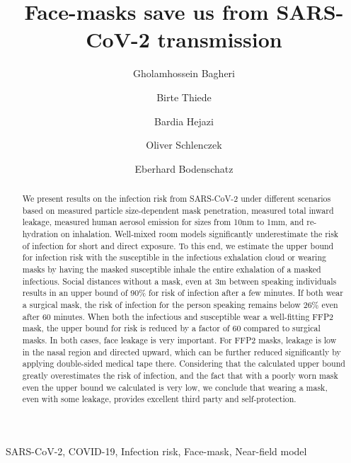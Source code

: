 \documentclass[preprint]{elsarticle}
\begin{document}
\begin{frontmatter}
\title{Face-masks save us from SARS-CoV-2 transmission}

\author[1]{Gholamhossein Bagheri}
\author[1]{Birte Thiede}
\author[1]{Bardia Hejazi}

\author[1]{Oliver Schlenczek}

\author[1,2,3]{Eberhard Bodenschatz}



\address[1]{Max Planck Institute for Dynamics and Self-Organization (MPIDS), Göttingen 37077 , Germany}
\address[2]{Institute for Dynamics of Complex Systems, University of Göttingen, Göttingen 37077 , Germany}
\address[3]{Laboratory of Atomic and Solid State Physics and Sibley School of Mechanical and Aerospace Engineering, Cornell University, Ithaca, NY 14853, USA}





\begin{abstract}
We present results on the infection risk from SARS-CoV-2 under different scenarios based on measured particle size-dependent mask penetration, measured total inward leakage, measured human aerosol emission for sizes from 10nm to 1mm, and re-hydration on inhalation. Well-mixed room models significantly underestimate the risk of infection for short and direct exposure. To this end, we estimate the upper bound for infection risk with the susceptible in the infectious exhalation cloud or wearing masks by having the masked susceptible inhale the entire exhalation of a masked infectious. Social distances without a mask, even at 3m between speaking individuals results in an upper bound of 90\% for risk of infection after a few minutes. If both wear a surgical mask, the risk of infection for the person speaking remains below 26\% even after 60 minutes.  When both the infectious and susceptible wear a well-fitting FFP2 mask, the upper bound for risk is reduced by a factor of 60 compared to surgical masks. In both cases, face leakage is very important. For FFP2 masks, leakage is low in the nasal region and directed upward, which can be further reduced significantly by applying double-sided medical tape there. Considering that the calculated upper bound greatly overestimates the risk of infection, and the fact that with a poorly worn mask even the upper bound we calculated is very low, we conclude that wearing a mask, even with some leakage, provides excellent third party and self-protection. 
\end{abstract}

\begin{keyword}
SARS-CoV-2, COVID-19, Infection risk, Face-mask, Near-field model  
\end{keyword}
\end{frontmatter}
\end{document}
